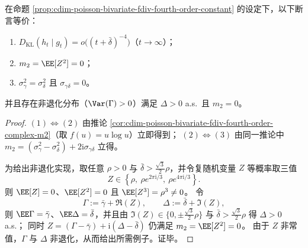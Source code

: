 \begin{proposition}[二阶对消判据与非退化可实现性]\label{prop:cdim-poisson-bivariate-second-order-cancellation-realizable}
在命题 \ref{prop:cdim-poisson-bivariate-fdiv-fourth-order-constant} 的设定下，以下断言等价：
\begin{enumerate}
  \item \(D_{\mathrm{KL}}(h_t\mid g_t)=o\bigl((t+\bar\delta)^{-4}\bigr)\)（\(t\to\infty\)）；
  \item \(m_2=\EE[Z^2]=0\)；
  \item \(\sigma_\gamma^2=\sigma_\delta^2\) 且 \(\sigma_{\gamma\delta}=0\)。
\end{enumerate}
并且存在非退化分布（\(\Var(\Gamma)>0\)）满足 \(\Delta>0\) a.s.\ 且 \(m_2=0\)。
\end{proposition}
\begin{proof}
\((1)\Longleftrightarrow(2)\) 由推论 \ref{cor:cdim-poisson-bivariate-fdiv-fourth-order-complex-m2}（取 \(f(u)=u\log u\)）立即得到；
\((2)\Longleftrightarrow(3)\) 由同一推论中 \(m_2=(\sigma_\gamma^2-\sigma_\delta^2)+2\mathrm{i}\sigma_{\gamma\delta}\) 立得。
\par
为给出非退化实现，取任意 \(\rho>0\) 与 \(\bar\delta>\frac{\sqrt3}{2}\rho\)，并令复随机变量 \(Z\) 等概率取三值
\[
Z\in\left\{\rho,\ \rho e^{2\pi\mathrm{i}/3},\ \rho e^{4\pi\mathrm{i}/3}\right\}.
\]
则 \(\EE[Z]=0\)、\(\EE[Z^2]=0\) 且 \(\EE[Z^3]=\rho^3\neq 0\)。
令
\[
\Gamma:=\bar\gamma+\Re(Z),\qquad
\Delta:=\bar\delta+\Im(Z),
\]
则 \(\EE\Gamma=\bar\gamma\)、\(\EE\Delta=\bar\delta\)，并且由 \(\Im(Z)\in\{0,\pm \tfrac{\sqrt3}{2}\rho\}\) 与 \(\bar\delta>\frac{\sqrt3}{2}\rho\) 得 \(\Delta>0\) a.s.；
同时 \(Z=(\Gamma-\bar\gamma)+\mathrm{i}(\Delta-\bar\delta)\) 仍满足 \(m_2=\EE[Z^2]=0\)。
由于 \(Z\) 非常值，\(\Gamma\) 与 \(\Delta\) 非退化，从而给出所需例子。证毕。
\end{proof}

